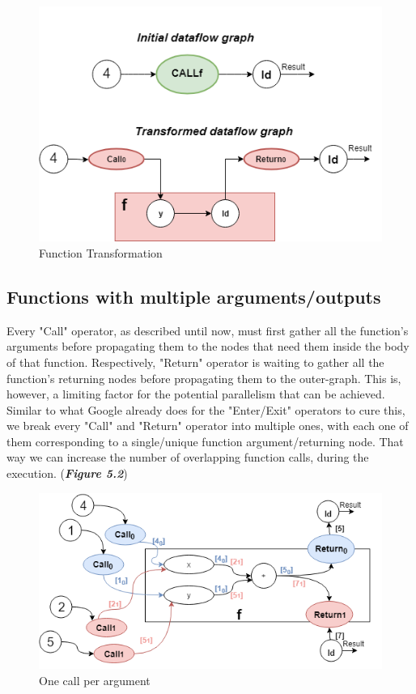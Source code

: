 \documentclass[ack,preface]{dithesis}
\begin{document}
\begin{figure}
\centering
\includegraphics[scale=0.65]{figures/transformation}
\caption{Function Transformation}
\end{figure}

    \subsection{Functions with multiple arguments/outputs}

Every "Call" operator, as described until now, must first gather all the function's arguments before propagating them to the nodes that need them inside the body of that function. Respectively, "Return" operator is waiting to gather all the function's returning nodes before propagating them to the outer-graph. This is, however, a limiting factor for the potential parallelism that can be achieved. Similar to what Google already does for the "Enter/Exit" operators to cure this, we break every "Call" and "Return" operator into multiple ones, with each one of them corresponding to a single/unique function argument/returning node. That way we can increase the number of overlapping function calls, during the execution. (\textit{\textbf{Figure 5.2}})

\begin{figure}[h]
\centering
\includegraphics[scale=0.62]{figures/breakops}
\caption{One call per argument}
\end{figure}
\end{document}
